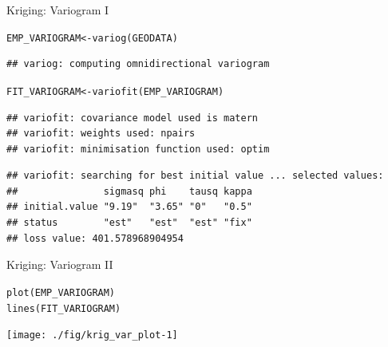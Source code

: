 \documentclass[xcolor=table,       handout,    xcolor=dvipsnames]{beamer}\usepackage[]{graphicx}\usepackage[]{color}
\makeatletter
\newcommand{\hlstd}[1]{\textcolor[rgb]{0,0,0}{#1}}
\newcommand{\hlkwb}[1]{\textcolor[rgb]{0,0,0}{#1}}
\newcommand{\hlkwd}[1]{\textcolor[rgb]{0,0,1}{#1}}
\newenvironment{kframe}{%
 \def\at@end@of@kframe{}%
 \ifinner\ifhmode%
  \def\at@end@of@kframe{\end{minipage}}%
  \begin{minipage}{\columnwidth}%
 \fi\fi%
 \def\FrameCommand##1{\hskip\@totalleftmargin \hskip-\fboxsep
 \colorbox{shadecolor}{##1}\hskip-\fboxsep
     \hskip-\linewidth \hskip-\@totalleftmargin \hskip\columnwidth}%
 \MakeFramed {\advance\hsize-\width
   \@totalleftmargin\z@ \linewidth\hsize
   \@setminipage}}%
 {\par\unskip\endMakeFramed%
 \at@end@of@kframe}
\newenvironment{knitrout}{}{} %
\makeatother
\begin{document}

\begin{frame}[fragile]{Kriging: Variogram I}
\begin{knitrout}\scriptsize
{}\color{fgcolor}\begin{kframe}
\begin{alltt}
\hlstd{EMP_VARIOGRAM} \hlkwb{<-} \hlkwd{variog}\hlstd{(GEODATA)}
\end{alltt}
\begin{verbatim}
## variog: computing omnidirectional variogram
\end{verbatim}
\begin{alltt}
\hlstd{FIT_VARIOGRAM} \hlkwb{<-} \hlkwd{variofit}\hlstd{(EMP_VARIOGRAM)}
\end{alltt}
\begin{verbatim}
## variofit: covariance model used is matern 
## variofit: weights used: npairs 
## variofit: minimisation function used: optim
\end{verbatim}


{\ttfamily\noindent\color{warningcolor}{\#\# Warning in variofit(EMP\_VARIOGRAM): initial values not provided - running the default search}}\begin{verbatim}
## variofit: searching for best initial value ... selected values:
##               sigmasq phi    tausq kappa
## initial.value "9.19"  "3.65" "0"   "0.5"
## status        "est"   "est"  "est" "fix"
## loss value: 401.578968904954
\end{verbatim}
\end{kframe}
\end{knitrout}
\end{frame}


\begin{frame}[fragile]{Kriging: Variogram II}
\begin{knitrout}
\color{fgcolor}\begin{kframe}
\begin{alltt}
\hlkwd{plot}\hlstd{(EMP_VARIOGRAM)}
\hlkwd{lines}\hlstd{(FIT_VARIOGRAM)}
\end{alltt}
\end{kframe}

{\centering \texttt{[image: ./fig/krig\_var\_plot-1]} 

}



\end{knitrout}
\end{frame}
\end{document}
